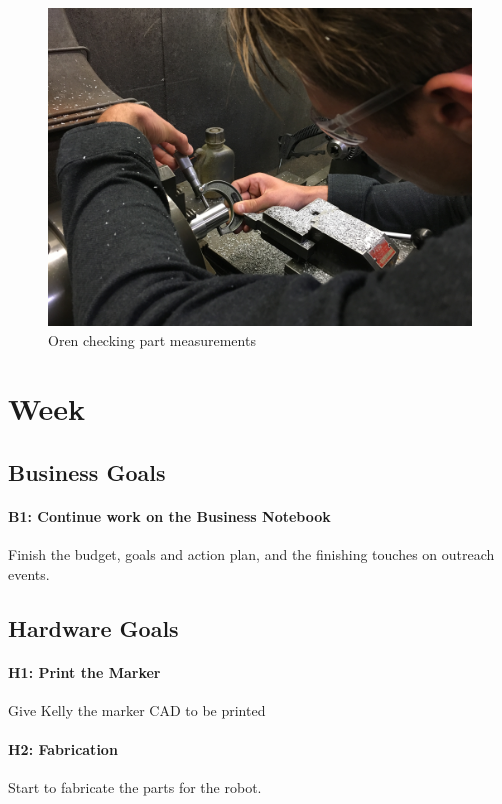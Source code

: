 \documentclass{article}
\begin{document}
\begin{figure}
    \centering
    \includegraphics[width=.6 \textwidth]{08_10-22/images/IMG_0330.JPG}
    \caption{Oren checking part measurements}
    \label{fig: Turning Inserts}
\end{figure}

\clearpage \newpage \section{Week \thesection} 
\subsection{Business Goals}
\paragraph{B1: Continue work on the Business Notebook}
 Finish the budget, goals and action plan, and the finishing touches on outreach events.
\subsection{Hardware Goals}
\paragraph{H1: Print the Marker}
 Give Kelly the marker CAD to be printed
\paragraph{H2: Fabrication}
 Start to fabricate the parts for the robot.
\end{document}
